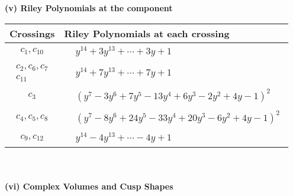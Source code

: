 \documentclass[1p]{elsarticle_modified}
\theoremstyle{definition}
\begin{document}
\newpage\renewcommand{\arraystretch}{1}
\flushleft \textbf{(v) Riley Polynomials at the component}\newline \\
\begin{tabular}{m{50pt}|m{274pt}}
Crossings & \hspace{64pt}Riley Polynomials at each crossing \\
\hline $$\begin{aligned}c_{1},c_{10}\end{aligned}$$&$\begin{aligned}
&y^{14}+3 y^{13}+\cdots+3 y+1
\end{aligned}$\\
\hline $$\begin{aligned}c_{2},c_{6},c_{7}\\c_{11}\end{aligned}$$&$\begin{aligned}
&y^{14}+7 y^{13}+\cdots+7 y+1
\end{aligned}$\\
\hline $$\begin{aligned}c_{3}\end{aligned}$$&$\begin{aligned}
&(y^7-3 y^6+7 y^5-13 y^4+6 y^3-2 y^2+4 y-1)^2
\end{aligned}$\\
\hline $$\begin{aligned}c_{4},c_{5},c_{8}\end{aligned}$$&$\begin{aligned}
&(y^7-8 y^6+24 y^5-33 y^4+20 y^3-6 y^2+4 y-1)^2
\end{aligned}$\\
\hline $$\begin{aligned}c_{9},c_{12}\end{aligned}$$&$\begin{aligned}
&y^{14}-4 y^{13}+\cdots-4 y+1
\end{aligned}$\\
\hline
\end{tabular}\\~\\
\newpage\flushleft \textbf{(vi) Complex Volumes and Cusp Shapes}
\end{document}
